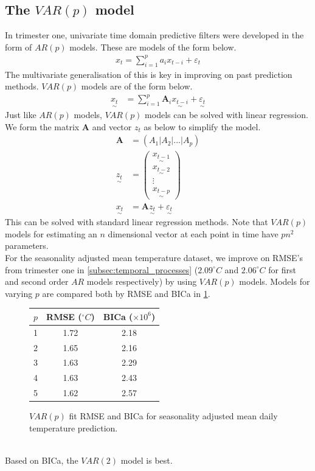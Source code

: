 \documentclass[12pt,a4paper]{article} %
\newcommand{\ve}[1]{\underset{\sim}{#1}}
\begin{document}
\subsection[The VAR(p) model]{The $VAR(p)$ model}
In trimester one, univariate time domain predictive filters were developed in the form of $AR(p)$ models. These are models of the form below.
\begin{align*}
    x_t=\sum_{i=1}^pa_ix_{t-i}+\varepsilon_t
\end{align*}
The multivariate generalisation of this is key in improving on past prediction methods. $VAR(p)$ models are of the form below.
\begin{align*}
    \ve{x_t}&=\sum_{i=1}^p\pmb{A}_i\ve{x_{t-i}}+\ve{\varepsilon_t}
\end{align*}
Just like $AR(p)$ models, $VAR(p)$ models can be solved with linear regression. We form the matrix $\pmb{A}$ and vector $z_t$ as below to simplify the model.
\begin{align*}
    \pmb{A}&=(A_1|A_2|...|A_p)\\
    \ve{z_t}&=\begin{pmatrix}
        \ve{x_{t-1}}\\
        \ve{x_{t-2}}\\
        \vdots\\
        \ve{x_{t-p}}
    \end{pmatrix}\\
    \ve{x_t}&=\pmb{A}\ve{z_t}+\ve{\varepsilon_t}
\end{align*}
This can be solved with standard linear regression methods. Note that $VAR(p)$ models for estimating an $n$ dimensional vector at each point in time have $pn^2$ parameters.\\
For the seasonality adjusted mean temperature dataset, we improve on RMSE's from trimester one in \ref{subsec:temporal_processes} ($2.09^\circ C$ and $2.06^\circ C$ for first and second order $AR$ models respectively) by using $VAR(p)$ models. Models for varying $p$ are compared both by RMSE and BICa in \ref{fig:VARp}.
\begin{figure}[!ht]
    \centering
    \begin{tabular}{|c|c|c|}
        \hline
        $p$ & RMSE ($^\circ C$) & BICa ($\times10^6$) \\
        \hline
        1 & 1.72 & 2.18 \\
        \hline
        2 & 1.65 & 2.16 \\
        \hline
        3 & 1.63 & 2.29 \\
        \hline
        4 & 1.63 & 2.43 \\
        \hline
        5 & 1.62 & 2.57 \\
        \hline
    \end{tabular}
    \caption{$VAR(p)$ fit RMSE and BICa for seasonality adjusted mean daily temperature prediction.}
    \label{fig:VARp}
\end{figure}
\\Based on BICa, the $VAR(2)$ model is best.
\end{document}
